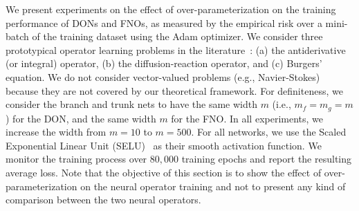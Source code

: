 We present experiments on
the effect of over-parameterization on the training performance of DONs and FNOs, as measured by the empirical risk over a mini-batch of the training dataset using the Adam optimizer. We consider three prototypical operator learning problems in the literature~\citep{li_fourier_2021,lu20201DeepONet}: %
(a) the antiderivative (or integral) operator, (b) the diffusion-reaction operator, and (c) Burgers' equation. We do not consider vector-valued problems (e.g., Navier-Stokes) because they are not 
covered by our theoretical framework. 
For definiteness, we consider the branch and trunk nets to have the same width $m$ (i.e., $m_f=m_g={m}$) for the DON, and the same width $m$ for the FNO. 
In all experiments, we increase the width from $m=10$ to $m=500$. 
For all networks, we use the Scaled Exponential Linear Unit (SELU)~\citep{selu-paper} as their smooth activation function. 
We monitor the training process over $80,000$ training epochs and report the resulting average loss. Note that the objective of this section is to show the effect of over-parameterization on the neural operator training and not to present any kind of comparison between the two neural operators. 
%

